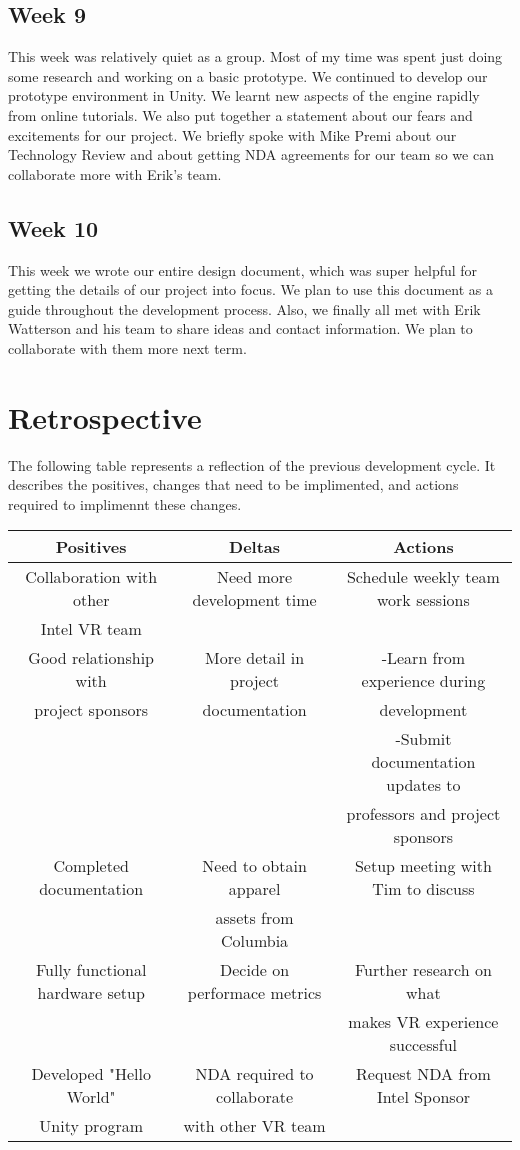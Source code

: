 \documentclass[10pt,journal,compsoc,onecolumn, draftclsnofoot]{IEEEtran}
\begin{document}
\subsection{Week 9}
This week was relatively quiet as a group.
Most of my time was spent just doing some research and working on a basic prototype.
We continued to develop our prototype environment in Unity.
We learnt new aspects of the engine rapidly from online tutorials.
We also put together a statement about our fears and excitements for our project.
We briefly spoke with Mike Premi about our Technology Review and about getting NDA agreements for our team so we can collaborate more with Erik's team.

\subsection{Week 10}
This week we wrote our entire design document, which was super helpful for getting the details of our project into focus.
We plan to use this document as a guide throughout the development process.
Also, we finally all met with Erik Watterson and his team to share ideas and contact information.
We plan to collaborate with them more next term.

\section{Retrospective}
The following table represents a reflection of the previous development cycle.
It describes the positives, changes that need to be implimented, and actions required to implimennt these changes.

\begin{center}
\begin{tabular}{ |c || c | c | }
 \hline
 Positives & Deltas & Actions \\
 \hline \hline
 Collaboration with other & Need more development time & Schedule weekly team work sessions\\
 Intel VR team & & \\ \hline
 Good relationship with & More detail in project & -Learn from experience during \\ project sponsors & documentation & development \\
 & & -Submit documentation updates to \\
 & & professors and project sponsors\\ \hline
 Completed documentation & Need to obtain apparel & Setup meeting with Tim to discuss\\
 & assets from Columbia & \\ \hline
 Fully functional hardware setup & Decide on performace metrics & Further research on what\\
 & & makes VR experience successful\\ \hline
 Developed "Hello World" & NDA required to collaborate & Request NDA from Intel Sponsor \\
 Unity program & with other VR team & \\
 \hline
\end{tabular}
\end{center}
\end{document}
